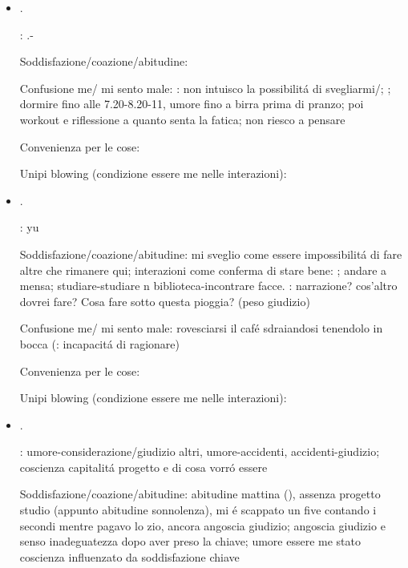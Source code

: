 \begin{itemize}
\item {}.

: .-

Soddisfazione/coazione/abitudine:

Confusione me/ mi sento male: : non intuisco la possibilit\'a di svegliarmi/; ; dormire fino alle 7.20-8.20-11, umore fino a birra prima di pranzo; poi workout e riflessione a quanto senta la fatica; non riesco a pensare

Convenienza per le cose:

Unipi blowing (condizione essere me nelle interazioni):

\item {}.

: yu

Soddisfazione/coazione/abitudine: mi sveglio come essere impossibilit\'a di fare altre che rimanere qui; interazioni come conferma di stare bene: ; andare a mensa; studiare-studiare n biblioteca-incontrare facce. : narrazione? cos'altro dovrei fare? Cosa fare sotto questa pioggia? (peso giudizio)

Confusione me/ mi sento male: rovesciarsi il caf\'e sdraiandosi tenendolo in bocca (: incapacit\'a di ragionare)

Convenienza per le cose:

Unipi blowing (condizione essere me nelle interazioni):

\item {}.

: umore-considerazione/giudizio altri, umore-accidenti, accidenti-giudizio; coscienza capitalit\'a progetto e di cosa vorr\'o essere

Soddisfazione/coazione/abitudine: abitudine mattina (), assenza progetto studio (appunto abitudine sonnolenza), mi \'e scappato un five contando i secondi mentre pagavo lo zio, ancora angoscia giudizio; angoscia giudizio e senso inadeguatezza dopo aver preso la chiave; umore essere me stato coscienza influenzato da soddisfazione chiave


\end{itemize}
